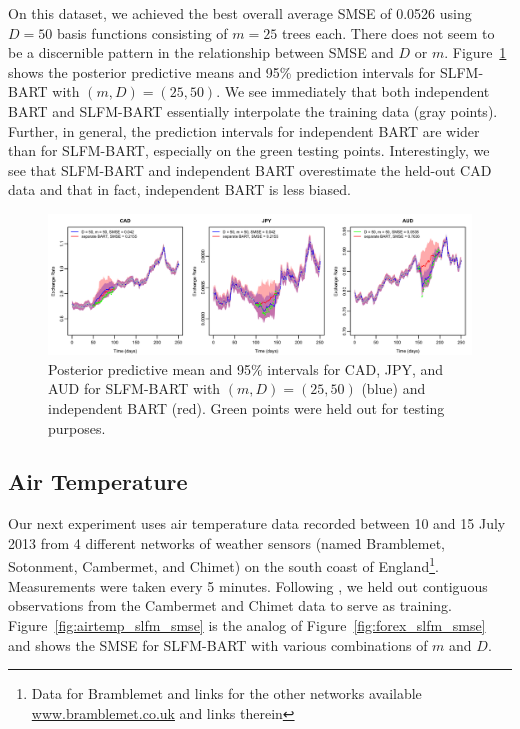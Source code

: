 \documentclass[12pt]{article}
\begin{document}
On this dataset, we achieved the best overall average SMSE of 0.0526 using $D = 50$ basis functions consisting of $m = 25$ trees each. 
There does not seem to be a discernible pattern in the relationship between SMSE and $D$ or $m.$
Figure~\ref{fig:forex_intervals} shows the posterior predictive means and 95\% prediction intervals for SLFM-BART with $(m,D) = (25,50).$
We see immediately that both independent BART and SLFM-BART essentially interpolate the training data (gray points). 
Further, in general, the prediction intervals for independent BART are wider than for SLFM-BART, especially on the green testing points.
Interestingly, we see that SLFM-BART and independent BART overestimate the held-out CAD data and that in fact, independent BART is less biased.
\begin{figure}[H]
\centering
\includegraphics[width = \textwidth]{../images/forex_intervals.png}
\caption{Posterior predictive mean and 95\% intervals for CAD, JPY, and AUD for SLFM-BART with $(m,D) = (25, 50)$ (blue) and independent BART (red). Green points were held out for testing purposes.}
\label{fig:forex_intervals}
\end{figure}

\subsection{Air Temperature}

Our next experiment uses air temperature data recorded between 10 and 15 July 2013 from 4 different networks of weather sensors (named Bramblemet, Sotonment, Cambermet, and Chimet) on the south coast of England\footnote{Data for Bramblemet and links for the other networks available \url{www.bramblemet.co.uk} and links therein}.
Measurements were taken every 5 minutes.
Following \citet{Nguyen2014}, we held out contiguous observations from the Cambermet and Chimet data to serve as training.
Figure~\ref{fig:airtemp_slfm_smse} is the analog of Figure~\ref{fig:forex_slfm_smse} and shows the SMSE for SLFM-BART with various combinations of $m$ and $D.$
\end{document}

